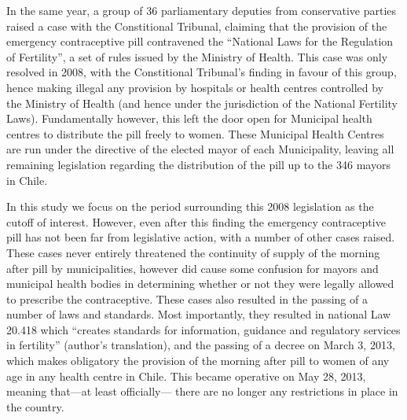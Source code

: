 \documentclass[11pt,subeqn]{article}
\begin{document}
\begin{spacing}{1.4}
In the same year, a group of 36 parliamentary deputies from conservative 
parties raised a case with the Constitional Tribunal, claiming that the 
provision of the emergency contraceptive pill contravened the ``National Laws
for the Regulation of Fertility'', a set of rules issued by the Ministry of
Health.  This case was only resolved in 2008, with the Constitional Tribunal's
finding in favour of this group, hence making illegal any provision by 
hospitals or health centres controlled by the Ministry of Health (and hence
under the jurisdiction of the National Fertility Laws).  Fundamentally however,
this left the door open for Municipal health centres to distribute the pill
freely to women.  These Municipal Health Centres are run under the directive
of the elected mayor of each Municipality, leaving all remaining legislation 
regarding the distribution of the pill up to the 346 mayors in Chile.

In this study we focus on the period surrounding this 2008 legislation as the 
cutoff of interest.  However, even after this finding the emergency 
contraceptive pill has not been far from legislative action, with a number of
other cases raised.  These cases never entirely threatened the continuity of
supply of the morning after pill by municipalities, however did cause some
confusion for mayors and municipal health bodies in determining whether or not
they were legally allowed to prescribe the contraceptive.  These cases also
resulted in the passing of a number of laws and standards.  Most importantly,
they resulted in national Law 20.418 which ``creates standards for information,
guidance and regulatory services in fertility'' (author's translation), and 
the passing of a decree on March 3, 2013, which makes obligatory the provision
of the morning after pill to women of any age in any health centre in Chile.  
This became operative on May 28, 2013, meaning that---at least officially---%
there are no longer any restrictions in place in the country.


\end{spacing}
\end{document}
